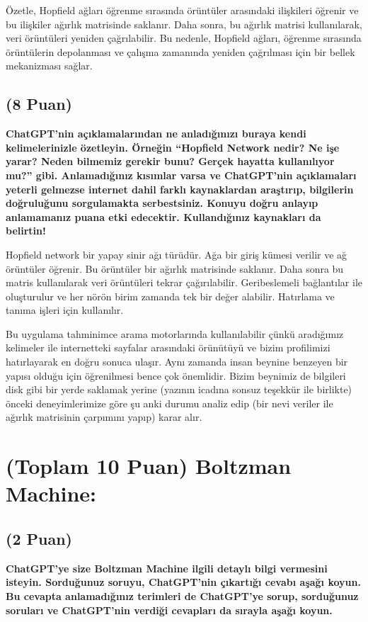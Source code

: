 \documentclass[11pt]{article}
\begin{document}
Özetle, Hopfield ağları öğrenme sırasında örüntüler arasındaki ilişkileri öğrenir ve bu ilişkiler ağırlık matrisinde saklanır. Daha sonra, bu ağırlık matrisi kullanılarak, veri örüntüleri yeniden çağrılabilir. Bu nedenle, Hopfield ağları, öğrenme sırasında örüntülerin depolanması ve çalışma zamanında yeniden çağrılması için bir bellek mekanizması sağlar.


\subsection{(8 Puan)} \textbf{ChatGPT’nin açıklamalarından ne anladığınızı buraya kendi kelimelerinizle özetleyin. Örneğin ``Hopfield Network nedir? Ne işe yarar? Neden bilmemiz gerekir bunu? Gerçek hayatta kullanılıyor mu?'' gibi. Anlamadığınız kısımlar varsa ve ChatGPT’nin açıklamaları yeterli gelmezse internet dahil farklı kaynaklardan araştırıp, bilgilerin doğruluğunu sorgulamakta serbestsiniz. Konuyu doğru anlayıp anlamamanız puana etki edecektir. Kullandığınız kaynakları da belirtin!}

Hopfield network bir yapay sinir ağı türüdür. Ağa bir giriş kümesi verilir ve ağ örüntüler öğrenir. Bu örüntüler bir ağırlık matrisinde saklanır. Daha sonra bu matris kullanılarak veri örüntüleri tekrar çağırılabilir. Geribeslemeli bağlantılar ile oluşturulur ve her nörön birim zamanda tek bir değer alabilir. Hatırlama ve tanıma işleri için kullanılır. 

Bu uygulama tahminimce arama motorlarında kullanılabilir çünkü aradığımız kelimeler ile internetteki sayfalar arasındaki örünütüyü ve bizim profilimizi hatırlayarak en doğru sonuca ulaşır. Aynı zamanda insan beynine benzeyen bir yapısı olduğu için öğrenilmesi bence çok önemlidir. Bizim beynimiz de bilgileri disk gibi bir yerde saklamak yerine (yazının icadına sonsuz teşekkür ile birlikte) önceki deneyimlerimize göre şu anki durumu analiz edip (bir nevi veriler ile ağırlık matrisinin çarpımını yapıp) karar alır.

\section{(Toplam 10 Puan) Boltzman Machine:}

\subsection{(2 Puan)} \textbf{ChatGPT’ye size Boltzman Machine ilgili detaylı bilgi vermesini isteyin. Sorduğunuz soruyu, ChatGPT'nin çıkartığı cevabı aşağı koyun. Bu cevapta anlamadığınız terimleri de ChatGPT’ye sorup, sorduğunuz soruları ve ChatGPT’nin verdiği cevapları da sırayla aşağı koyun.}
\end{document}
